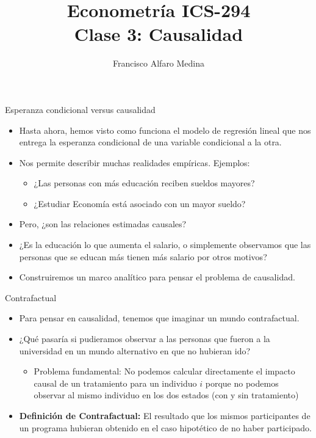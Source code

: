 \documentclass[10pt]{beamer}
\title[ICS-294]{Econometría ICS-294\\ \small{Clase 3: Causalidad}}
\author{Francisco Alfaro Medina}
\institute[USM]
{Universidad Técnica Federico Santa María\\ %
	\medskip
	\textit{} %
	
}
\date{}
\begin{document}
	
\begin{frame}
	\titlepage %

\end{frame}

\begin{frame}{Esperanza condicional versus causalidad}
    \begin{itemize}
        \item Hasta ahora, hemos visto como funciona el modelo de regresión lineal que nos entrega la esperanza condicional de una variable condicional a la otra.
        \item Nos permite describir muchas realidades empíricas. Ejemplos:
        \begin{itemize}
            \item ¿Las personas con más educación reciben sueldos mayores?
            \item ¿Estudiar Economía está asociado con un mayor sueldo?
        \end{itemize}
        \item Pero, ¿son las relaciones estimadas causales?
        \item ¿Es la educación lo que aumenta el salario, o simplemente observamos que las personas que se educan más tienen más salario por otros motivos?
        \item Construiremos un marco analítico para pensar el problema de causalidad.
    \end{itemize}
\end{frame}

\begin{frame}{Contrafactual}
    \begin{itemize}
        \item Para pensar en causalidad, tenemos que imaginar un mundo contrafactual.
        \item ¿Qué pasaría si pudieramos observar a las personas que fueron a la universidad en un mundo alternativo en que no hubieran ido?
        \begin{itemize}
            \item Problema fundamental: No podemos calcular directamente el impacto causal de un tratamiento para un individuo $i$ porque no podemos observar al mismo individuo en los dos estados (con y sin tratamiento)
        \end{itemize}
        \item \textbf{Definición de Contrafactual:} El resultado que los mismos participantes de un programa hubieran obtenido en el caso hipotético de no haber participado.
    \end{itemize}
\end{frame}
\end{document}
